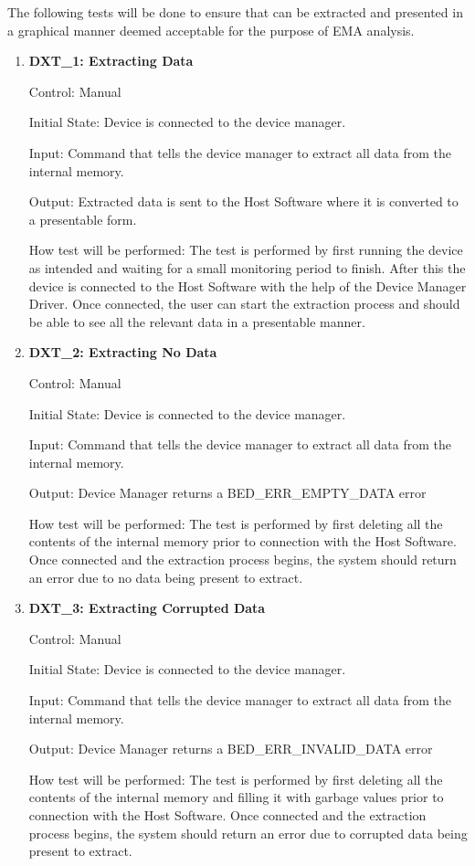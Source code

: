 \documentclass[12pt, titlepage]{article}
\begin{document}
The following tests will be done to ensure that can be extracted and presented in a graphical manner deemed acceptable for the purpose of EMA analysis.
\begin{enumerate}
	\item{\textbf{DXT\_1: Extracting Data} \\}\label{DXT1}
	
		Control: Manual 
							
		Initial State: Device is connected to the device manager.
							
		Input: Command that tells the device manager to extract all data from the internal memory.
		
		Output: Extracted data is sent to the Host Software where it is converted to a presentable form.

		How test will be performed: The test is performed by first running the device as intended and waiting for a small monitoring period to finish. After this the device is connected to the Host Software with the 				help of the Device Manager Driver. Once connected, the user can start the extraction process and should be able to see all the relevant data in a presentable manner.
		
	\item{\textbf{DXT\_2: Extracting No Data} \\}\label{DXT2}
	
		Control: Manual 
							
		Initial State: Device is connected to the device manager.
							
		Input: Command that tells the device manager to extract all data from the internal memory.
		
		Output: Device Manager returns a BED\_ERR\_EMPTY\_DATA error

		How test will be performed: The test is performed by first deleting all the contents of the internal memory prior to connection with the Host Software. Once connected and the extraction process begins, the 				system should return an error due to no data being present to extract.

	\item{\textbf{DXT\_3: Extracting Corrupted Data} \\}\label{DXT3}
	
		Control: Manual 
							
		Initial State: Device is connected to the device manager.
							
		Input: Command that tells the device manager to extract all data from the internal memory.
		
		Output: Device Manager returns a BED\_ERR\_INVALID\_DATA error

		How test will be performed: The test is performed by first deleting all the contents of the internal memory and filling it with garbage values prior to connection with the Host Software. Once connected and 				the extraction process begins, the system should return an error due to corrupted data being present to extract.
\end{enumerate}
\end{document}
